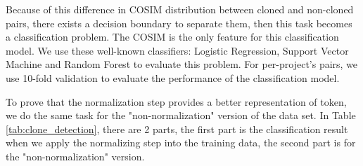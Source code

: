 Because of this difference in COSIM distribution between cloned and non-cloned pairs, there exists a decision boundary to separate them, then this task becomes a classification problem. The COSIM is the only feature for this classification model. We use these well-known classifiers: Logistic Regression, Support Vector Machine and Random Forest to evaluate this problem. For per-project's pairs, we use 10-fold validation to evaluate the performance of the classification model.

To prove that the normalization step provides a better representation of token, we do the same task for the "non-normalization" version of the data set. In Table \ref{tab:clone_detection}, there are 2 parts, the first part is the classification result when we apply the normalizing step into the training data, the second part is for the "non-normalization" version.






